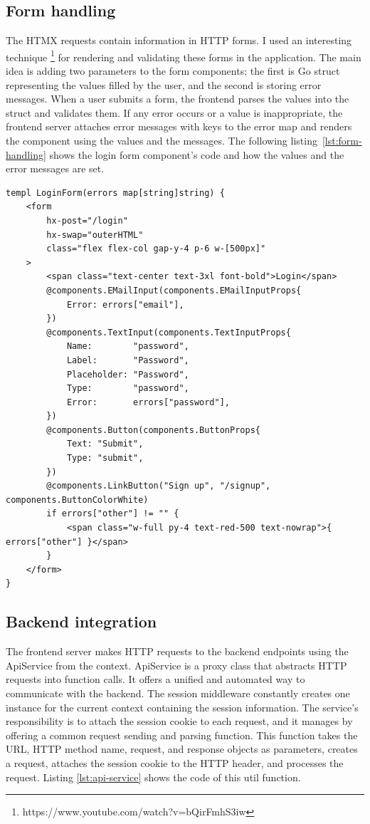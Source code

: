 \subsection{Form handling}

The HTMX requests contain information in HTTP forms. I used an interesting technique \footnote{https://www.youtube.com/watch?v=bQirFmhS3iw} for rendering and validating these forms in the application. The main idea is adding two parameters to the form components; the first is Go struct representing the values filled by the user, and the second is storing error messages. When a user submits a form, the frontend parses the values into the struct and validates them. If any error occurs or a value is inappropriate, the frontend server attaches error messages with keys to the error map and renders the component using the values and the messages. The following listing~\ref{lst:form-handling} shows the login form component's code and how the values and the error messages are set.

\begin{lstlisting}[caption=Login form,label=lst:form-handling]
templ LoginForm(errors map[string]string) {
	<form
		hx-post="/login"
		hx-swap="outerHTML"
		class="flex flex-col gap-y-4 p-6 w-[500px]"
	>
		<span class="text-center text-3xl font-bold">Login</span>
		@components.EMailInput(components.EMailInputProps{
			Error: errors["email"],
		})
		@components.TextInput(components.TextInputProps{
			Name:        "password",
			Label:       "Password",
			Placeholder: "Password",
			Type:        "password",
			Error:       errors["password"],
		})
		@components.Button(components.ButtonProps{
			Text: "Submit",
			Type: "submit",
		})
		@components.LinkButton("Sign up", "/signup", components.ButtonColorWhite)
		if errors["other"] != "" {
			<span class="w-full py-4 text-red-500 text-nowrap">{ errors["other"] }</span>
		}
	</form>
}
\end{lstlisting}

\subsection{Backend integration}

The frontend server makes HTTP requests to the backend endpoints using the ApiService from the context. ApiService is a proxy class that abstracts HTTP requests into function calls. It offers a unified and automated way to communicate with the backend. The session middleware constantly creates one instance for the current context containing the session information. The service's responsibility is to attach the session cookie to each request, and it manages by offering a common request sending and parsing function. This function takes the URL, HTTP method name, request, and response objects as parameters, creates a request, attaches the session cookie to the HTTP header, and processes the request. Listing \ref{lst:api-service} shows the code of this util function.

